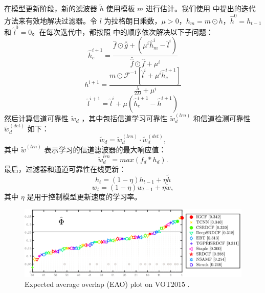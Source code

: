在模型更新阶段，新的滤波器 $\tilde{h}$ 使用模板 $m$ 进行估计。我们使用 \cite{Lukezic2017DiscriminativeCF} 中提出的迭代方法来有效地解决过滤器。令 $l$ 为拉格朗日乘数，$\mu > 0$，$h_m=m \odot h$，$\hat{h}^0 = h_{t-1}$ 和 $\hat{l}^0 = 0$。在每次迭代中，都按照 \cite{Lukezic2017DiscriminativeCF}中的顺序依次解决以下子问题：
\begin{equation} \label{eq:h1}
\hat{h}_c^{i+1} = \frac{\hat{f} \odot \bar{\hat{g}} +(\mu^i \hat{h}_m^i - \hat{l}^i)}{\bar{\hat{f}} \odot \hat f + \mu^i}
\end{equation}
\begin{equation}
h^{i+1} = \frac{m \odot \mathcal{F}^{-1}[\hat{l}^i + \mu^i\hat{h}_c^{i+1}]}{\frac{\lambda}{2D} + \mu^i}
\end{equation}
\begin{equation} \label{eq:h3}
\hat{l}^{i+1} = \hat{l}^i + \mu(\hat{h}_c^{i+1} - \hat{h}^{i+1})
\end{equation}
然后计算信道可靠性 $\tilde w_d$ \cite{Lukezic2017DiscriminativeCF} ，其中包括信道学习可靠性 $\tilde w_d^{(lrn)}$ 和信道检测可靠性 $\tilde w_d^{(det)}$ 如下： 
\begin{equation} \label{eq:c}
\tilde w_d = \tilde w_d^{(lrn)} \cdot \tilde w_d^{(det)},
\end{equation}
其中 $\tilde{w}^{(lrn)}$ 表示学习的信道滤波器的最大响应值：
\begin{equation} \label{eq:lrn}
\tilde{w}_d^{lrn} = max(f_d * h_d).
\end{equation}
最后，过滤器和通道可靠性在线更新：\begin{equation} \label{eq:update1}
h_t = (1 - \eta)h_{t-1} + \eta \tilde{h}
\end{equation}
\begin{equation} \label{eq:update2}
w_t = (1-\eta)w_{t-1} + \eta \tilde{w},
\end{equation}
其中 $\eta$ 是用于控制模型更新速度的学习率。

\begin{figure}
    \centering
    \includegraphics[width=1.0\textwidth]{Img/IGCF/vot/eao_rank_vot2015.png}
    \caption{Expected average overlap (EAO) plot on VOT2015 \cite{Kristan2015TheVO}.}
    \label{fig:vot15}
\end{figure}

